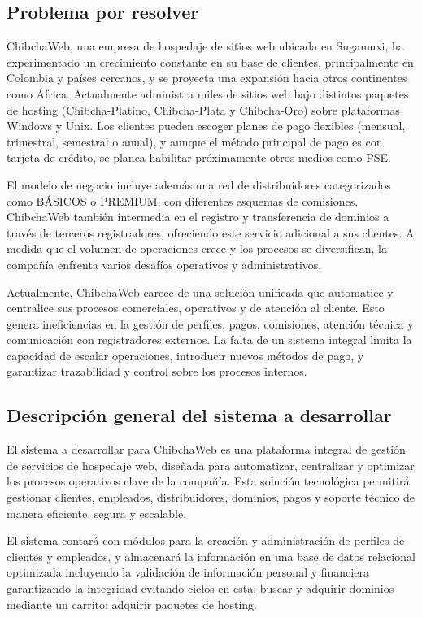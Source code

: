 \subsection{Problema por resolver}
ChibchaWeb, una empresa de hospedaje de sitios web ubicada en Sugamuxi, ha experimentado un crecimiento constante en su base de clientes, principalmente en Colombia y países cercanos, y se proyecta una expansión hacia otros continentes como África. Actualmente administra miles de sitios web bajo distintos paquetes de hosting (Chibcha-Platino, Chibcha-Plata y Chibcha-Oro) sobre plataformas Windows y Unix. Los clientes pueden escoger planes de pago flexibles (mensual, trimestral, semestral o anual), y aunque el método principal de pago es con tarjeta de crédito, se planea habilitar próximamente otros medios como PSE.

El modelo de negocio incluye además una red de distribuidores categorizados como BÁSICOS o PREMIUM, con diferentes esquemas de comisiones. ChibchaWeb también intermedia en el registro y transferencia de dominios a través de terceros registradores, ofreciendo este servicio adicional a sus clientes. A medida que el volumen de operaciones crece y los procesos se diversifican, la compañía enfrenta varios desafíos operativos y administrativos.

Actualmente, ChibchaWeb carece de una solución unificada que automatice y centralice sus procesos comerciales, operativos y de atención al cliente. Esto genera ineficiencias en la gestión de perfiles, pagos, comisiones, atención técnica y comunicación con registradores externos. La falta de un sistema integral limita la capacidad de escalar operaciones, introducir nuevos métodos de pago, y garantizar trazabilidad y control sobre los procesos internos.

\subsection{Descripción general del sistema a desarrollar}
El sistema a desarrollar para ChibchaWeb es una plataforma integral de gestión de servicios de hospedaje web, diseñada para automatizar, centralizar y optimizar los procesos operativos clave de la compañía. Esta solución tecnológica permitirá gestionar clientes, empleados, distribuidores, dominios, pagos y soporte técnico de manera eficiente, segura y escalable.

El sistema contará con módulos para la creación y administración de perfiles de clientes y empleados, y almacenará la información en una base de datos relacional optimizada incluyendo la validación de información personal y financiera garantizando la integridad evitando ciclos en esta; buscar y adquirir dominios mediante un carrito; adquirir paquetes de hosting.\\


